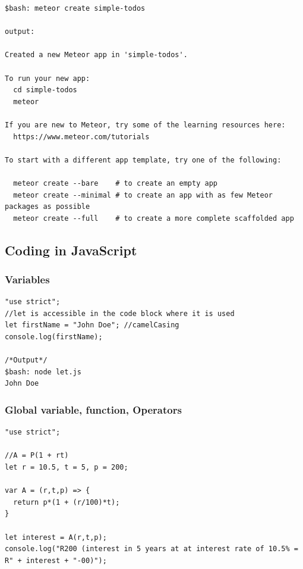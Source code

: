 \documentclass[10pt, a4paper, twocolumn]{article}
\begin{document}
\begin{lstlisting}
$bash: meteor create simple-todos

output:

Created a new Meteor app in 'simple-todos'.

To run your new app:
  cd simple-todos
  meteor

If you are new to Meteor, try some of the learning resources here:
  https://www.meteor.com/tutorials

To start with a different app template, try one of the following:

  meteor create --bare    # to create an empty app
  meteor create --minimal # to create an app with as few Meteor packages as possible
  meteor create --full    # to create a more complete scaffolded app

\end{lstlisting}



\subsection{Coding in JavaScript}

\subsubsection{Variables}

\begin{lstlisting}
"use strict";
//let is accessible in the code block where it is used
let firstName = "John Doe"; //camelCasing
console.log(firstName);

/*Output*/
$bash: node let.js
John Doe
\end{lstlisting}

\subsubsection{Global variable, function, Operators}
\begin{lstlisting}
"use strict";

//A = P(1 + rt)
let r = 10.5, t = 5, p = 200;

var A = (r,t,p) => {
  return p*(1 + (r/100)*t);
}

let interest = A(r,t,p);
console.log("R200 (interest in 5 years at at interest rate of 10.5% = R" + interest + "-00)");

\end{lstlisting}
\end{document}
